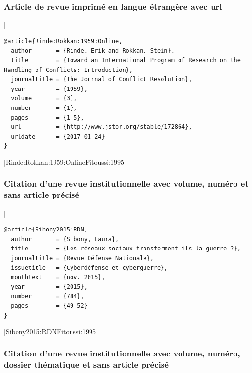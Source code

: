 \documentclass{article}
\begin{document}
\subsubsection{Article de revue imprimé en langue étrangère avec url}

|
\begin{verbatim}
@article{Rinde:Rokkan:1959:Online,
  author       = {Rinde, Erik and Rokkan, Stein},
  title        = {Toward an International Program of Research on the Handling of Conflicts: Introduction},
  journaltitle = {The Journal of Conflict Resolution},
  year         = {1959},
  volume       = {3},
  number       = {1},
  pages        = {1-5},
  url          = {http://www.jstor.org/stable/172864},
  urldate      = {2017-01-24}
}
\end{verbatim}
|{Rinde:Rokkan:1959:Online}{Fitoussi:1995}

\subsubsection{Citation d'une revue institutionnelle avec volume, numéro et sans article précisé}

|
\begin{verbatim}
@article{Sibony2015:RDN,
  author       = {Sibony, Laura},
  title        = {Les réseaux sociaux transforment ils la guerre ?},
  journaltitle = {Revue Défense Nationale},
  issuetitle   = {Cyberdéfense et cyberguerre},
  monthtext    = {nov. 2015},
  year         = {2015},
  number       = {784},
  pages        = {49-52}
}
\end{verbatim}
|{Sibony2015:RDN}{Fitoussi:1995}

\subsubsection{Citation d'une revue institutionnelle avec volume, numéro, dossier thématique et sans article précisé}
\end{document}
